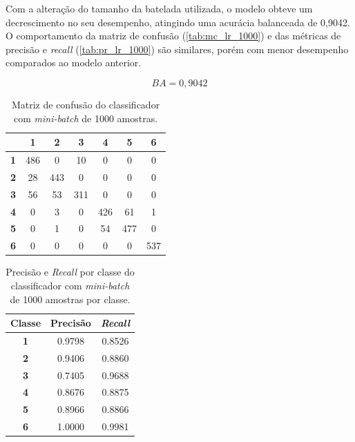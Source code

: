 Com a alteração do tamanho da batelada utilizada, o modelo obteve um decrescimento no seu desempenho, atingindo uma acurácia balanceada de 0,9042. O comportamento da matriz de confusão (\autoref{tab:mc_lr_1000}) e das métricas de precisão e \textit{recall} (\autoref{tab:pr_lr_1000}) são similares, porém com menor desempenho comparados ao modelo anterior.

\begin{equation}\label{eq:ba_lr_1000}
BA = 0,9042
\end{equation}

\begin{table}[H]
\centering
\begin{tabular}{c||c|c|c|c|c|c|}
	\cline{2-7}
	& \textbf{1} & \textbf{2} & \textbf{3} & \textbf{4} & \textbf{5} & \textbf{6} \\ \hline\hline
	\multicolumn{1}{|c||}{\textbf{1}} & 486        & 0          & 10         & 0          & 0          & 0          \\ \hline
	\multicolumn{1}{|c||}{\textbf{2}} & 28         & 443        & 0          & 0          & 0          & 0          \\ \hline
	\multicolumn{1}{|c||}{\textbf{3}} & 56         & 53         & 311        & 0          & 0          & 0          \\ \hline
	\multicolumn{1}{|c||}{\textbf{4}} & 0          & 3          & 0          & 426        & 61         & 1          \\ \hline
	\multicolumn{1}{|c||}{\textbf{5}} & 0          & 1          & 0          & 54         & 477        & 0          \\ \hline
	\multicolumn{1}{|c||}{\textbf{6}} & 0          & 0          & 0          & 0          & 0          & 537        \\ \hline
\end{tabular}
\caption{Matriz de confusão do classificador com \textit{mini-batch} de 1000 amostras.}
\label{tab:mc_lr_1000}
\end{table}

\begin{table}[H]
\centering
\begin{tabular}{c|c|c}
	\textbf{Classe} & \textbf{Precisão} & \textit{\textbf{Recall}} \\ \hline
	\textbf{1}      & 0.9798            & 0.8526                   \\
	\textbf{2}      & 0.9406            & 0.8860                   \\
	\textbf{3}      & 0.7405            & 0.9688                   \\
	\textbf{4}      & 0.8676            & 0.8875                   \\
	\textbf{5}      & 0.8966            & 0.8866                   \\
	\textbf{6}      & 1.0000            & 0.9981                  
\end{tabular}
\caption{Precisão e \textit{Recall} por classe do classificador com \textit{mini-batch} de 1000 amostras por classe.}
\label{tab:pr_lr_1000}
\end{table}




